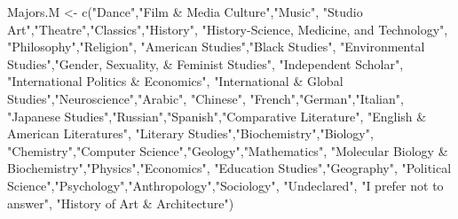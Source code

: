 \documentclass[
]{article}
\newenvironment{Shaded}{\begin{snugshade}}{\end{snugshade}}
\newcommand{\FunctionTok}[1]{\textcolor[rgb]{0.00,0.00,0.00}{#1}}
\newcommand{\NormalTok}[1]{#1}
\newcommand{\OtherTok}[1]{\textcolor[rgb]{0.56,0.35,0.01}{#1}}
\newcommand{\StringTok}[1]{\textcolor[rgb]{0.31,0.60,0.02}{#1}}
\begin{document}
\begin{Shaded}
\begin{Highlighting}[]
                         
\NormalTok{Majors.M }\OtherTok{\textless{}{-}} \FunctionTok{c}\NormalTok{(}\StringTok{"Dance"}\NormalTok{,}\StringTok{"Film \& Media Culture"}\NormalTok{,}\StringTok{"Music"}\NormalTok{,}
              \StringTok{"Studio Art"}\NormalTok{,}\StringTok{"Theatre"}\NormalTok{,}\StringTok{"Classics"}\NormalTok{,}\StringTok{"History"}\NormalTok{,}
              \StringTok{"History{-}Science, Medicine, and Technology"}\NormalTok{,}
              \StringTok{"Philosophy"}\NormalTok{,}\StringTok{"Religion"}\NormalTok{, }\StringTok{"American Studies"}\NormalTok{,}\StringTok{"Black Studies"}\NormalTok{,}
              \StringTok{"Environmental Studies"}\NormalTok{,}\StringTok{"Gender, Sexuality, \& Feminist Studies"}\NormalTok{,}
              \StringTok{"Independent Scholar"}\NormalTok{,}
              \StringTok{"International Politics \& Economics"}\NormalTok{,}
              \StringTok{"International \& Global Studies"}\NormalTok{,}\StringTok{"Neuroscience"}\NormalTok{,}\StringTok{"Arabic"}\NormalTok{,}
              \StringTok{"Chinese"}\NormalTok{,}
              \StringTok{"French"}\NormalTok{,}\StringTok{"German"}\NormalTok{,}\StringTok{"Italian"}\NormalTok{,}
              \StringTok{"Japanese Studies"}\NormalTok{,}\StringTok{"Russian"}\NormalTok{,}\StringTok{"Spanish"}\NormalTok{,}\StringTok{"Comparative Literature"}\NormalTok{,}
              \StringTok{"English \& American Literatures"}\NormalTok{,}
              \StringTok{"Literary Studies"}\NormalTok{,}\StringTok{"Biochemistry"}\NormalTok{,}\StringTok{"Biology"}\NormalTok{,  }
              \StringTok{"Chemistry"}\NormalTok{,}\StringTok{"Computer Science"}\NormalTok{,}\StringTok{"Geology"}\NormalTok{,}\StringTok{"Mathematics"}\NormalTok{,}
              \StringTok{"Molecular Biology \& Biochemistry"}\NormalTok{,}\StringTok{"Physics"}\NormalTok{,}\StringTok{"Economics"}\NormalTok{,}
              \StringTok{"Education Studies"}\NormalTok{,}\StringTok{"Geography"}\NormalTok{,}
              \StringTok{"Political Science"}\NormalTok{,}\StringTok{"Psychology"}\NormalTok{,}\StringTok{"Anthropology"}\NormalTok{,}\StringTok{"Sociology"}\NormalTok{,}
              \StringTok{"Undeclared"}\NormalTok{, }\StringTok{"I prefer not to answer"}\NormalTok{, }
              \StringTok{"History of Art \& Architecture"}\NormalTok{)}


\end{Highlighting}
\end{Shaded}
\end{document}

